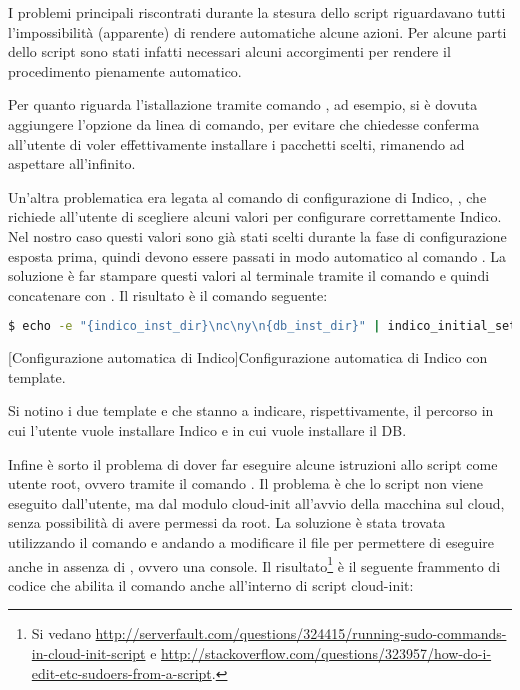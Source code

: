             I problemi principali riscontrati durante la stesura dello script riguardavano tutti l'impossibilità (apparente) di rendere automatiche alcune azioni. Per alcune parti dello script sono stati infatti necessari alcuni accorgimenti per rendere il procedimento pienamente automatico.
            
            Per quanto riguarda l'istallazione tramite comando , ad esempio, si è dovuta aggiungere l'opzione  da linea di comando, per evitare che  chiedesse conferma all'utente di voler effettivamente installare i pacchetti scelti, rimanendo ad aspettare all'infinito.
            
            Un'altra problematica era legata al comando di configurazione di Indico, , che richiede all'utente di scegliere alcuni valori per configurare correttamente Indico. Nel nostro caso questi valori sono già stati scelti durante la fase di configurazione esposta prima, quindi devono essere passati in modo automatico al comando . La soluzione è far stampare questi valori al terminale tramite il comando  e quindi concatenare  con . Il risultato è il comando seguente:
            
            \begin{center}
                \begin{minipage}{\linewidth}
                    \begin{lstlisting}[language=bash, gobble=22]
                        $ echo -e "{indico_inst_dir}\nc\ny\n{db_inst_dir}" | indico_initial_setup
                    \end{lstlisting}
                    \captionsetup{textformat=empty,labelformat=empty} \vspace{-2em}
                    [Configurazione automatica di Indico]{Configurazione automatica di Indico con template.}
                \end{minipage}
            \end{center}
            
            Si notino i due template  e  che stanno a indicare, rispettivamente, il percorso in cui l'utente vuole installare Indico e in cui vuole installare il \ac{DB}.
            
            Infine è sorto il problema di dover far eseguire alcune istruzioni allo script come utente root, ovvero tramite il comando . Il problema è che lo script non viene eseguito dall'utente, ma dal modulo cloud-init all'avvio della macchina sul cloud, senza possibilità di avere permessi da root. La soluzione è stata trovata utilizzando il comando  e andando a modificare il file  per permettere di eseguire  anche in assenza di , ovvero una console. Il risultato\footnote{Si vedano \url{http://serverfault.com/questions/324415/running-sudo-commands-in-cloud-init-script} e \url{http://stackoverflow.com/questions/323957/how-do-i-edit-etc-sudoers-from-a-script}.} è il seguente frammento di codice che abilita il comando  anche all'interno di script cloud-init:
            
